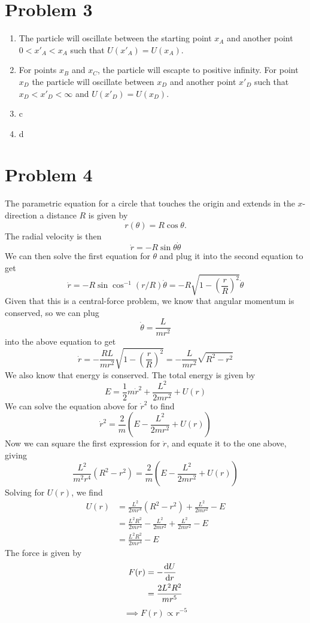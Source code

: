 \documentclass[12pt]{article}
\begin{document}
\section*{Problem 3}
\begin{enumerate}[label=(\alph*)]
    \item The particle will oscillate between the starting point $x_A$ and another point $0<x'_A<x_A$ such that $U(x'_A) = U(x_A)$.
    \item For points $x_B$ and $x_C$, the particle will escapte to positive infinity. For point $x_D$ the particle will oscillate between $x_D$ and another point $x'_D$ such that $x_D<x'_D<\infty$ and $U(x'_D) = U(x_D)$.
    \item c
    \item d
\end{enumerate}



\section*{Problem 4}
The parametric equation for a circle that touches the origin and extends in the $x$-direction a distance $R$ is given by
\[ r(\theta) = R\cos\theta. \]
The radial velocity is then
\[ \dot{r} = -R\sin\theta\dot{\theta} \]
We can then solve the first equation for $\theta$ and plug it into the second equation to get
\[ \dot{r} = -R\sin\cos^{-1}(r/R)\dot{\theta} = -R\sqrt{1 - \left(\frac{r}{R}\right)^2}\dot{\theta} \]
Given that this is a central-force problem, we know that angular momentum is conserved, so we can plug
\[ \dot{\theta} = \frac{L}{mr^2} \]
into the above equation to get
\[ \dot{r} = -\frac{RL}{mr^2}\sqrt{1 - \left(\frac{r}{R}\right)^2} = -\frac{L}{mr^2}\sqrt{R^2 - r^2} \]
We also know that energy is conserved. The total energy is given by
\[ E = \frac{1}{2}m\dot{r}^2 + \frac{L^2}{2mr^2} + U(r) \]
We can solve the equation above for $\dot{r}^2$ to find
\[ \dot{r}^2 = \frac{2}{m}\left(E - \frac{L^2}{2mr^2} + U(r)\right) \]
Now we can square the first expression for $\dot{r}$, and equate it to the one above, giving
\[ \frac{L^2}{m^2r^4}\left(R^2 - r^2\right) = \frac{2}{m}\left(E - \frac{L^2}{2mr^2} + U(r)\right) \]
Solving for $U(r)$, we find
\begin{align*}
    U(r) &= \frac{L^2}{2mr^4}\left(R^2 - r^2\right) + \frac{L^2}{2mr^2} - E \\
    &= \frac{L^2R^2}{2mr^4} - \frac{L^2}{2mr^2} + \frac{L^2}{2mr^2} - E \\
    &= \frac{L^2R^2}{2mr^4} - E
\end{align*}
The force is given by
\begin{align*}
    F(r) &= -\dv{U}{r} \\
    &= \frac{2L^2R^2}{mr^5}
\end{align*}
\[ \implies \boxed{F(r) \propto r^{-5   }} \]
\end{document}
